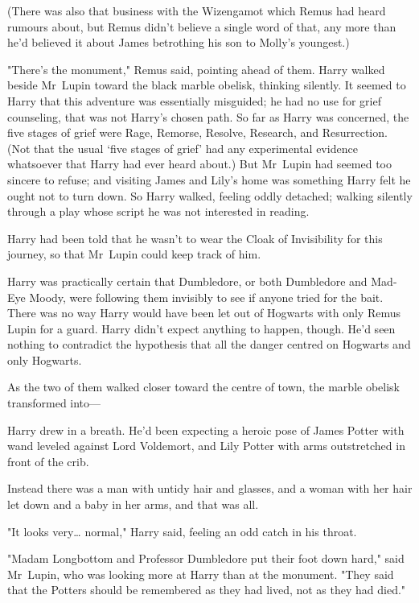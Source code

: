 (There was also that business with the Wizengamot which Remus had heard rumours
about, but Remus didn't believe a single word of that, any more than he'd
believed it about James betrothing his son to Molly's youngest.)

"There's the monument," Remus said, pointing ahead of them.
\later
Harry walked beside Mr~Lupin toward the black marble obelisk, thinking
silently. It seemed to Harry that this adventure was essentially misguided; he
had no use for grief counseling, that was not Harry's chosen path. So far as
Harry was concerned, the five stages of grief were Rage, Remorse, Resolve,
Research, and Resurrection. (Not that the usual `five stages of grief' had any
experimental evidence whatsoever that Harry had ever heard about.) But
Mr~Lupin had seemed too sincere to refuse; and visiting James and Lily's home
was something Harry felt he ought not to turn down. So Harry walked, feeling
oddly detached; walking silently through a play whose script he was not
interested in reading.

Harry had been told that he wasn't to wear the Cloak of Invisibility for this
journey, so that Mr~Lupin could keep track of him.

Harry was practically certain that Dumbledore, or both Dumbledore and Mad-Eye
Moody, were following them invisibly to see if anyone tried for the bait. There
was no way Harry would have been let out of Hogwarts with only Remus Lupin for
a guard. Harry didn't expect anything to happen, though. He'd seen nothing to
contradict the hypothesis that all the danger centred on Hogwarts and only
Hogwarts.

As the two of them walked closer toward the centre of town, the marble obelisk
transformed into---

Harry drew in a breath. He'd been expecting a heroic pose of James Potter with
wand leveled against Lord Voldemort, and Lily Potter with arms outstretched in
front of the crib.

Instead there was a man with untidy hair and glasses, and a woman with her hair
let down and a baby in her arms, and that was all.

"It looks very{\ldots} normal," Harry said, feeling an odd catch in his throat.

"Madam Longbottom and Professor Dumbledore put their foot down hard," said
Mr~Lupin, who was looking more at Harry than at the monument. "They said that
the Potters should be remembered as they had lived, not as they had died."


